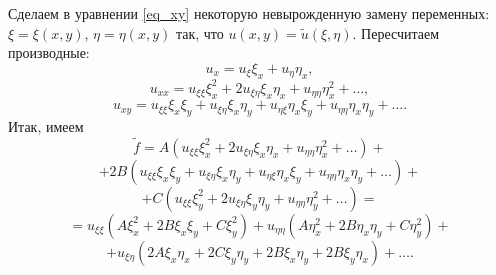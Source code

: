 \documentclass[12pt,a5paper]{book}
\begin{document}
	Сделаем в уравнении \eqref{eq_xy} некоторую невырожденную замену переменных: $\xi = \xi(x,y)$, $\eta = \eta(x,y)$ так, что $u(x,y) = \tilde{u}(\xi,\eta)$. Пересчитаем производные:
	\begin{equation*}
		u_x = u_\xi\xi_x + u_\eta\eta_x,
	\end{equation*}
	\begin{equation*}
		u_{xx} = u_{\xi\xi}\xi^2_x + 2u_{\xi\eta}\xi_x\eta_x + u_{\eta\eta}\eta^2_x + \dots,
	\end{equation*}
	\begin{equation*}
		u_{xy} = u_{\xi\xi}\xi_x\xi_y + u_{\xi\eta}\xi_x\eta_y + u_{\eta\xi}\eta_x\xi_y + u_{\eta\eta}\eta_x\eta_y + \dots.
	\end{equation*}
	Итак, имеем
	\begin{equation*}
		\tilde{f} = A\left(u_{\xi\xi}\xi^2_x + 2u_{\xi\eta}\xi_x\eta_x + u_{\eta\eta}\eta^2_x + \dots\right) +
	\end{equation*}
	\begin{equation*}
		+ 2B\left(u_{\xi\xi}\xi_x\xi_y + u_{\xi\eta}\xi_x\eta_y + u_{\eta\xi}\eta_x\xi_y + u_{\eta\eta}\eta_x\eta_y + \dots\right) +
	\end{equation*}
	\begin{equation*}
		+ C\left(u_{\xi\xi}\xi^2_y + 2u_{\xi\eta}\xi_y\eta_y + u_{\eta\eta}\eta^2_y + \dots\right) = 
	\end{equation*}
	\begin{equation*}
		= u_{\xi\xi}\left(A\xi^2_x + 2B\xi_x\xi_y + C\xi^2_y\right) + u_{\eta\eta}\left(A\eta^2_x + 2B\eta_x\eta_y + C\eta^2_y\right) +
	\end{equation*}
	\begin{equation*}
		+ u_{\xi\eta}\left(2A\xi_x\eta_x + 2C\xi_y\eta_y + 2B\xi_x\eta_y + 2B\xi_y\eta_x\right) + \dots.
	\end{equation*}
	
\end{document}
